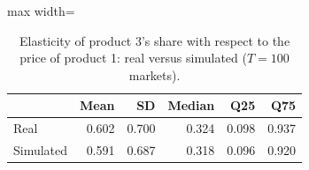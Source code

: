 \begin{table}[H]
\centering\small
\caption{Elasticity of product 3's share with respect to the price of product 1: real versus simulated ($T=100$ markets).}\label{tab:q8d_cell_31}
\begin{adjustbox}{max width=\linewidth}
\begin{tabular}{lrrrrr}
\toprule
 & Mean & SD & Median & Q25 & Q75 \\
\midrule
Real & 0.602 & 0.700 & 0.324 & 0.098 & 0.937 \\
Simulated & 0.591 & 0.687 & 0.318 & 0.096 & 0.920 \\
\bottomrule
\end{tabular}
\end{adjustbox}
\par\vspace{3pt}{\footnotesize Element $(3,1)$ of the elasticity matrix $\partial s_j/\partial p_k\cdot p_k/s_j$ across the 100 markets; simulated uses the Q8c estimates, real uses the true parameters.}
\end{table}
